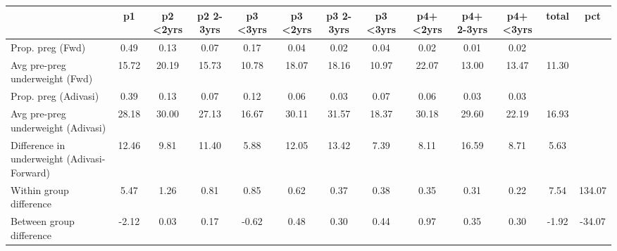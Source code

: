 \begin{tabular}{l*{12}{c}}
\toprule
            &\multicolumn{1}{c}{p1}&\multicolumn{1}{c}{p2 \textless2yrs}&\multicolumn{1}{c}{p2 2-3yrs}&\multicolumn{1}{c}{p3 \textless3yrs}&\multicolumn{1}{c}{p3 \textless2yrs}&\multicolumn{1}{c}{p3 2-3yrs}&\multicolumn{1}{c}{p3 \textless3yrs}&\multicolumn{1}{c}{p4+ \textless2yrs}&\multicolumn{1}{c}{p4+ 2-3yrs}&\multicolumn{1}{c}{p4+ \textless3yrs}&\multicolumn{1}{c}{total}&\multicolumn{1}{c}{pct}\\
\midrule
\midrule
Prop. preg (Fwd)&        0.49&        0.13&        0.07&        0.17&        0.04&        0.02&        0.04&        0.02&        0.01&        0.02&            &            \\
Avg pre-preg underweight (Fwd)&       15.72&       20.19&       15.73&       10.78&       18.07&       18.16&       10.97&       22.07&       13.00&       13.47&       11.30&            \\
Prop. preg (Adivasi)&        0.39&        0.13&        0.07&        0.12&        0.06&        0.03&        0.07&        0.06&        0.03&        0.03&            &            \\
Avg pre-preg underweight (Adivasi)&       28.18&       30.00&       27.13&       16.67&       30.11&       31.57&       18.37&       30.18&       29.60&       22.19&       16.93&            \\
Difference in underweight (Adivasi-Forward)&       12.46&        9.81&       11.40&        5.88&       12.05&       13.42&        7.39&        8.11&       16.59&        8.71&        5.63&            \\
Within group difference&        5.47&        1.26&        0.81&        0.85&        0.62&        0.37&        0.38&        0.35&        0.31&        0.22&        7.54&      134.07\\
Between group difference&       -2.12&        0.03&        0.17&       -0.62&        0.48&        0.30&        0.44&        0.97&        0.35&        0.30&       -1.92&      -34.07\\
\bottomrule
\end{tabular}
